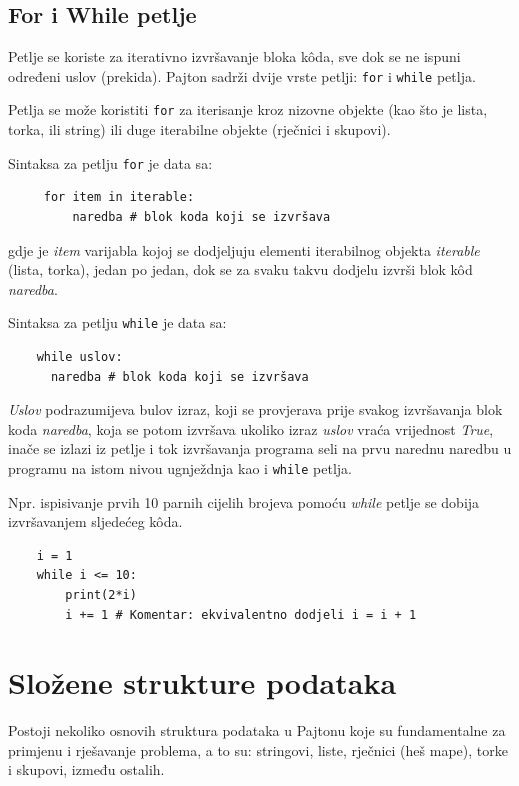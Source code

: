 \subsection{For i While petlje }

Petlje se koriste za iterativno izvršavanje bloka k\^oda, sve dok se ne ispuni određeni uslov (prekida). Pajton sadrži dvije vrste petlji: \texttt{for} i \texttt{while} petlja.

Petlja se može koristiti \texttt{for} za iterisanje kroz nizovne objekte (kao što je lista, torka, ili string) ili duge iterabilne objekte (rječnici i skupovi).

Sintaksa za petlju \texttt{for} je data sa:
\begin{verbatim}
     for item in iterable:
         naredba # blok koda koji se izvršava
\end{verbatim}
gdje je \emph{item} varijabla kojoj se dodjeljuju elementi iterabilnog objekta \textit{iterable} (lista, torka), jedan po jedan, dok se za svaku takvu dodjelu izvrši blok k\^od \emph{naredba}. 
 
Sintaksa za petlju \texttt{while} je data sa:

\begin{verbatim}
    while uslov:
	  naredba # blok koda koji se izvršava
\end{verbatim}
\emph{Uslov} podrazumijeva bulov izraz, koji se provjerava prije svakog izvršavanja blok koda \emph{naredba}, koja se potom izvršava ukoliko izraz \emph{uslov} vraća vrijednost  \emph{True}, inače se izlazi iz petlje i tok izvršavanja programa seli na prvu narednu naredbu u programu na istom nivou ugnježdnja kao i \texttt{while} petlja. 

Npr. ispisivanje prvih 10 parnih cijelih brojeva pomoću \textit{while} petlje se dobija izvršavanjem sljedećeg k\^oda.

\begin{verbatim}
	i = 1
	while i <= 10:
	    print(2*i)
	    i += 1 # Komentar: ekvivalentno dodjeli i = i + 1
\end{verbatim}

\section{Složene strukture podataka}

Postoji nekoliko osnovih struktura podataka  u Pajtonu koje su fundamentalne za primjenu i rješavanje problema, a to su: stringovi, liste, rječnici (heš mape), torke i skupovi, između ostalih.  %

